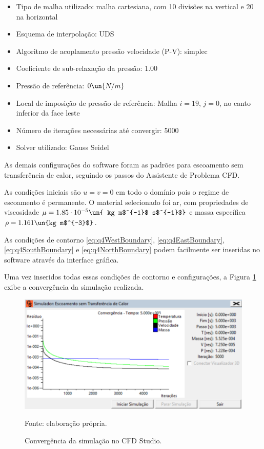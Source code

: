 \begin{itemize}
    \item Tipo de malha utilizado: malha cartesiana, com 10 divisões na vertical e 20 na horizontal
    \item Esquema de interpolação: UDS
    \item Algoritmo de acoplamento pressão velocidade (P-V): simplec
    \item Coeficiente de sub-relaxação da pressão: 1.00
    \item Pressão de referência: $0 \un{N/m}$
    \item Local de imposição de pressão de referência: Malha $i = 19$, $j = 0$, no canto inferior da face leste
    \item Número de iterações necessárias até convergir: 5000
    \item Solver utilizado: Gauss Seidel
\end{itemize}

As demais configurações do software foram as padrões para escoamento sem transferência de calor,
seguindo os passos do Assistente de Problema CFD.

As condições iniciais são $u = v = 0$ em todo o domínio pois o regime de escoamento é permanente.
O material selecionado foi ar, com propriedades de viscosidade $\mu=1.85 \cdot 10^{-5} \un{ kg m$^{-1}$ s$^{-1}$}$ e
massa específica $\rho=1.161 \un{kg m$^{-3}$}$.

As condições de contorno \eqref{eq:q4WestBoundary}, \eqref{eq:q4EastBoundary}, 
\eqref{eq:q4SouthBoundary} e \eqref{eq:q4NorthBoundary} podem facilmente ser inseridas 
no software através da interface gráfica. 

Uma vez inseridos todas essas condições de contorno e configurações, a Figura \ref*{fig:convergencia}
exibe a convergência da simulação realizada.

\begin{figure}[h!]
    \caption{Convergência da simulação no CFD Studio.}
    \label{fig:convergencia}
    \centering
    \centerline{\includegraphics[scale=0.45]{convergencia.png}}
    \par{Fonte: elaboração própria.}
\end{figure}

